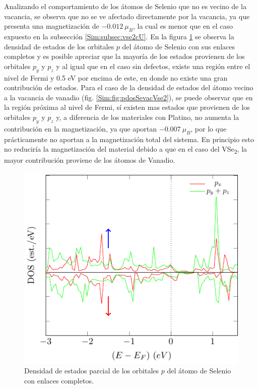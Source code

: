 \par Analizando el comportamiento de los \'atomos de Selenio que no es vecino de la vacancia, se observa que  no se ve afectado directamente por la vacancia, ya que presenta una magnetizaci\'on de $-0.012~\mu_{B}$, la cual es menor que en el caso expuesto en la subsecci\'on \ref{Sim:subsec:vse2cU}. En la figura \ref{Sim:fig:pdosSeVse2} se observa la densidad de estados de los orbitales $p$ del \'atomo de Selenio con sus enlaces completos y es posible apreciar que la mayor\'ia de los estados provienen de los orbitales $p_y$ y $p_z$ y al igual que en el caso sin defectos, existe una regi\'on entre el nivel de Fermi y 0.5 eV por encima de este, en donde no existe una gran contribuci\'on de estados. Para el caso de la densidad de estados del \'atomo vecino  a la vacancia de vanadio (fig. \ref{Sim:fig:pdosSevacVse2}), se puede observar que en la regi\'on pr\'oxima al nivel de Fermi, s\'i existen mas estados que provienen de los orbitales $p_y$ y $p_z$ y, a diferencia de los materiales con Platino, no aumenta la contribuci\'on en la magnetizaci\'on, ya que aportan $-0.007~ \mu_{B}$, por  lo que pr\'acticamente no aportan a la magnetizaci\'on total del sistema. En principio esto no reducir\'ia la magnetizaci\'on del material debido a que en el caso del VSe\textsubscript{2}, la mayor contribuci\'on proviene de los \'atomos de Vanadio.
 
\begin{figure}[!hbt]
	\centering
	\includegraphics[scale=1]{figRes/VSe2/def/bandas/nosoc/pdosSe.pdf}
	\caption[Densidad de estados parcial de los orbitales $p$ del \'atomo de Selenio en VSe\textsubscript{2} con vacancia de vanadio]{Densidad de estados parcial de los orbitales $p$ del \'atomo de Selenio con enlaces completos.}
	\label{Sim:fig:pdosSeVse2}
\end{figure}

